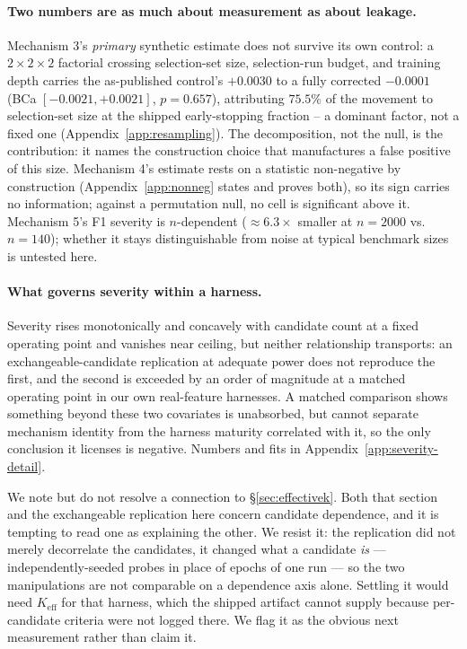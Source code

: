 \documentclass{article}
\begin{document}
\paragraph{Two numbers are as much about measurement as about leakage.}
Mechanism 3's \emph{primary} synthetic estimate does not survive its own
control: a $2\times2\times2$ factorial crossing selection-set size,
selection-run budget, and training depth carries the as-published control's
$+0.0030$ to a fully corrected $-0.0001$ (BCa $[-0.0021,+0.0021]$,
$p=0.657$), attributing $75.5\%$ of the movement to selection-set size at the
shipped early-stopping fraction -- a dominant factor, not a fixed one
(Appendix~\ref{app:resampling}).
The decomposition, not the null, is the contribution: it names the
construction choice that manufactures a false positive of this size.
Mechanism 4's estimate rests on a statistic non-negative by construction
(Appendix~\ref{app:nonneg} states and proves both), so its sign carries no
information; against a permutation null, no cell is significant above it.
Mechanism 5's F1 severity is $n$-dependent ($\approx6.3\times$ smaller at
$n{=}2000$ vs.\ $n{=}140$); whether it stays distinguishable from noise at
typical benchmark sizes is untested here.

\paragraph{What governs severity within a harness.}
\label{sec:severity}
Severity rises
monotonically and concavely with candidate count at a fixed operating point
and vanishes near ceiling, but neither relationship transports: an
exchangeable-candidate replication at adequate power does not reproduce the
first, and the second is exceeded by an order of magnitude at a matched
operating point in our own real-feature harnesses. A matched comparison shows
something beyond these two covariates is unabsorbed, but cannot separate
mechanism identity from the harness maturity correlated with it, so the only
conclusion it licenses is negative. Numbers and fits in
Appendix~\ref{app:severity-detail}.

We note but do not resolve a connection to \S\ref{sec:effectivek}. Both that
section and the exchangeable replication here concern candidate dependence,
and it is tempting to read one as explaining the other. We resist it: the
replication did not merely decorrelate the candidates, it changed what a
candidate \emph{is} --- independently-seeded probes in place of epochs of one
run --- so the two manipulations are not comparable on a dependence axis
alone. Settling it would need $K_{\text{eff}}$ for that harness, which the
shipped artifact cannot supply because per-candidate criteria were not logged
there. We flag it as the obvious next measurement rather than claim it.
\end{document}
